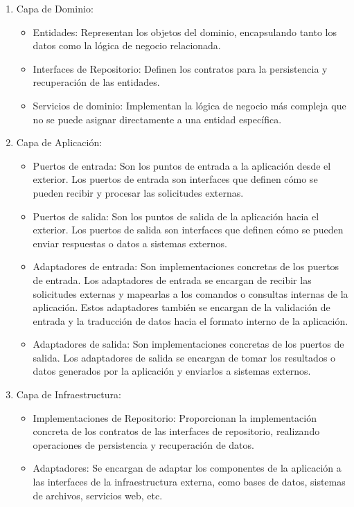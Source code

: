 \documentclass[executivepaper]{article}
\begin{document}
\begin{enumerate}
    \item Capa de Dominio:
    \begin{itemize}
        \item Entidades: Representan los objetos del dominio, encapsulando tanto los datos como la lógica de negocio relacionada.
        \item Interfaces de Repositorio: Definen los contratos para la persistencia y recuperación de las entidades.
        \item Servicios de dominio: Implementan la lógica de negocio más compleja que no se puede asignar directamente a una entidad específica.
    \end{itemize}
    \item Capa de Aplicación:
    \begin{itemize}
        \item Puertos de entrada: Son los puntos de entrada a la aplicación desde el exterior. Los puertos de entrada son interfaces que definen cómo se pueden recibir y procesar las solicitudes externas.
        \item Puertos de salida: Son los puntos de salida de la aplicación hacia el exterior. Los puertos de salida son interfaces que definen cómo se pueden enviar respuestas o datos a sistemas externos.
        \item Adaptadores de entrada: Son implementaciones concretas de los puertos de entrada. Los adaptadores de entrada se encargan de recibir las solicitudes externas y mapearlas a los comandos o consultas internas de la aplicación. Estos adaptadores también se encargan de la validación de entrada y la traducción de datos hacia el formato interno de la aplicación.
        \item Adaptadores de salida: Son implementaciones concretas de los puertos de salida. Los adaptadores de salida se encargan de tomar los resultados o datos generados por la aplicación y enviarlos a sistemas externos.
    \end{itemize}
    \item Capa de Infraestructura:
    \begin{itemize}
        \item Implementaciones de Repositorio: Proporcionan la implementación concreta de los contratos de las interfaces de repositorio, realizando operaciones de persistencia y recuperación de datos.
        \item Adaptadores: Se encargan de adaptar los componentes de la aplicación a las interfaces de la infraestructura externa, como bases de datos, sistemas de archivos, servicios web, etc.

\end{itemize}
\end{enumerate}
\end{document}
